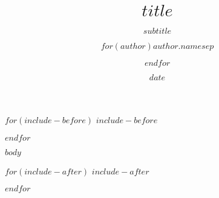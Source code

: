 \documentclass[
  $if(fontsize)$
  $fontsize$,
  $endif$french, %
  $if(papersize)$
  $papersize$,
  $endif$$for(classoption)$
  $classoption$$sep$,$endfor$]{beamer}
\title{$title$}
\subtitle{$subtitle$}
\author{$for(author)$$author.name$$sep$ \and $endfor$}
\institute[ENSG]{École nationale des sciences géographiques}
\date{$date$}
\begin{document}

\begin{frame}
  \titlepage
\end{frame}

$for(include-before)$
$include-before$

$endfor$

$body$

$for(include-after)$
$include-after$

$endfor$
\end{document}
